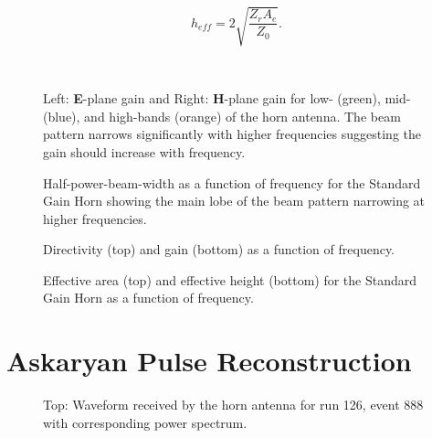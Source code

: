 \begin{equation}
h_{eff} = 2\sqrt{\frac{Z_{r}A_{e}}{Z_0}}.
\end{equation}

\begin{figure}[htbp]
\centerline{
\mbox{
\epsfxsize=3.5in
\epsfxsize=3.5in
}}
\caption{Left: \textbf{E}-plane gain and Right: \textbf{H}-plane gain for low- (green), mid- (blue), and high-bands (orange) of the horn antenna.  The beam pattern narrows significantly with higher frequencies suggesting the gain should increase with frequency.}
\label{fig:gainPattern}
\end{figure}

\begin{figure}[htbp]
\centering
\epsfxsize=4.0in
\caption{Half-power-beam-width as a function of frequency for the Standard Gain Horn showing the main lobe of the beam pattern narrowing at higher frequencies.}
\label{fig:gainDirFreq}
\end{figure}

\begin{figure}[htbp]
\centering
\epsfxsize=4.0in
\caption{Directivity (top) and gain (bottom) as a function of frequency.}
\label{fig:gainDirFreq}
\end{figure}

\begin{figure}[htbp]
\centering
\epsfxsize=4.0in
\caption{Effective area (top) and effective height (bottom) for the Standard Gain Horn as a function of frequency.}
\label{fig:gainDirFreq}
\end{figure}

\section{Askaryan Pulse Reconstruction}
\label{ss:askPulseRecon}

\begin{figure}[htbp]
\centering
\epsfxsize=4.0in
\caption{Top:  Waveform received by the horn antenna for run 126, event 888 with corresponding power spectrum.}
\label{fig:hornWvfmPsd}
\end{figure}

